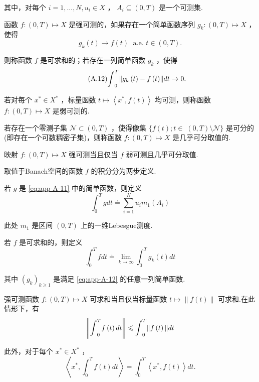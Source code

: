 其中，对每个 $i = 1,\ldots ,N,{u}_{i} \in  X$ ， ${A}_{i} \subseteq  \left(  {0,T}\right)$ 是一个可测集.

函数 $f : \left(  {0,T}\right)   \mapsto  X$ 是强可测的，如果存在一个简单函数序列 ${g}_{k} : \left(  {0,T}\right)   \mapsto  X$ ，使得
\[
{g}_{k}\left( t\right)  \rightarrow  f\left( t\right) \;\text{ a.e. }t \in  \left(  {0,T}\right)  .
\]

则称函数 $f$ 是可求和的；若存在一列简单函数 ${g}_{k}$ ，使得
\begin{equation}\tag{A.12}\label{eq:app-A-12}
{\int }_{0}^{T}\norm{{g}_{k}\left( t\right)  - f\left( t\right) }{dt} \rightarrow  0.
\end{equation}

若对每个 ${x}^{ * } \in  {X}^{ * }$ ，标量函数 $t \mapsto  \left\langle  {{x}^{ * },f\left( t\right) }\right\rangle$ 均可测，则称函数 $f : \left(  {0,T}\right)   \mapsto  X$ 是弱可测的.

若存在一个零测子集 $\mathcal{N} \subset  \left(  {0,T}\right)$ ，使得像集 $\{ f\left( t\right) ;t \in \; \left(  {0,T}\right)   \setminus  \mathcal{N}\}$ 是可分的(即存在一个可数稠密子集)，则称函数 $f : \left(  {0,T}\right)   \mapsto  X$ 是几乎可分取值的.

\begin{theorem}[Pettis]\label{thm:app-A-14}
映射 $f : \left(  {0,T}\right)   \mapsto  X$ 强可测当且仅当 $f$ 弱可测且几乎可分取值.
\end{theorem}

取值于Banach空间的函数 $f$ 的积分分为两步定义.

若 $g$ 是 \eqref{eq:app-A-11} 中的简单函数，则定义
\[
{\int }_{0}^{T}{gdt} \doteq  \sum_{{i = 1}}^{N}{u}_{i}{m}_{1}\left( {A}_{i}\right)
\]

此处 ${m}_{1}$ 是区间 $\left(  {0,T}\right)$ 上的一维Lebesgue测度.

若 $f$ 是可求和的，则定义
\[
{\int }_{0}^{T}{fdt} \doteq  \mathop{\lim }\limits_{{k \rightarrow  \infty }}{\int }_{0}^{T}{g}_{k}\left( t\right) {dt}
\]

其中 ${\left( {g}_{k}\right) }_{k \geq  1}$ 是满足 \eqref{eq:app-A-12} 的任意一列简单函数.

\begin{theorem}[Bochner]\label{thm:app-A-15}
强可测函数 $f : \left(  {0,T}\right)   \mapsto  X$ 可求和当且仅当标量函数 $t \mapsto  \| f\left( t\right) \|$ 可求和.在此情形下，有
\[
\norm{{\int }_{0}^{T}f\left( t\right) {dt}} \leqslant  {\int }_{0}^{T}\| f\left( t\right) \| {dt}
\]

此外，对于每个 ${x}^{ * } \in  {X}^{ * }$ ，
\[
\left\langle  {{x}^{ * },{\int }_{0}^{T}f\left( t\right) {dt}}\right\rangle   = {\int }_{0}^{T}\left\langle  {{x}^{ * },f\left( t\right) }\right\rangle  {dt}.
\]
\end{theorem}

